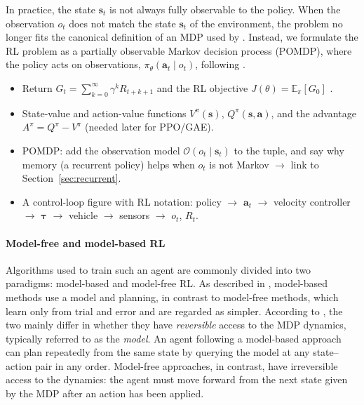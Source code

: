 In practice, the state $\mathbf{s}_t$ is not always fully observable to the policy. When the observation $o_t$ does not match the state $\mathbf{s}_t$ of the environment, the problem no longer fits the canonical definition of an MDP used by \textcite{sutton2018reinforcement}. Instead, we formulate the RL problem as a partially observable Markov decision process (POMDP), where the policy acts on observations, $\pi_\theta(\mathbf{a}_t \mid o_t)$, following \textcite{song2023reaching}.

\begin{itemize}
  \item Return $G_t = \sum_{k=0}^{\infty}\gamma^k R_{t+k+1}$ and the RL objective
        $J(\theta) = \mathbb{E}_{\pi}[G_0]$ \parencite[Sec.~3.3]{sutton2018reinforcement}.
  \item State-value and action-value functions $V^\pi(\mathbf{s})$, $Q^\pi(\mathbf{s},\mathbf{a})$,
        and the advantage $A^\pi = Q^\pi - V^\pi$ (needed later for PPO/GAE).
  \item POMDP: add the observation model $\mathcal{O}(o_t \mid \mathbf{s}_t)$ to the tuple, and
        say why memory (a recurrent policy) helps when $o_t$ is not Markov
        $\rightarrow$ link to Section~\ref{sec:recurrent}.
  \item A control-loop figure with RL notation: policy $\rightarrow$ $\mathbf{a}_t$
        $\rightarrow$ velocity controller $\rightarrow$ $\boldsymbol{\tau}$
        $\rightarrow$ vehicle $\rightarrow$ sensors $\rightarrow$ $o_t$, $R_t$.
\end{itemize}

\paragraph{Model-free and model-based RL}
Algorithms used to train such an agent are commonly divided into two paradigms: model-based and model-free RL. As described in \textcite[Sec.~1.4]{sutton2018reinforcement}, model-based methods use a model and planning, in contrast to model-free methods, which learn only from trial and error and are regarded as simpler. According to \textcite{moerland2023mbrl}, the two mainly differ in whether they have \textit{reversible} access to the MDP dynamics, typically referred to as the \textit{model}. An agent following a model-based approach can plan repeatedly from the same state by querying the model at any state--action pair in any order. Model-free approaches, in contrast, have irreversible access to the dynamics: the agent must move forward from the next state given by the MDP after an action has been applied.

